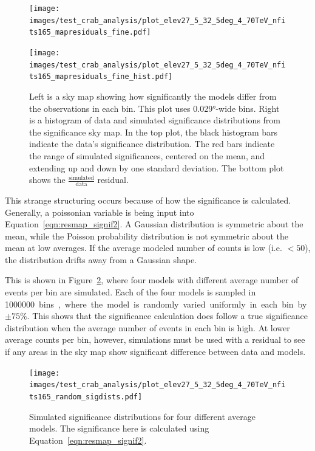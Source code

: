 \begin{figure}[h]
  \centering
  \hfill
  \begin{minipage}{0.4\textwidth}
    \centering
    \texttt{[image: images/test\_crab\_analysis/plot\_elev27\_5\_32\_5deg\_4\_70TeV\_nfits165\_mapresiduals\_fine.pdf]}
  \end{minipage}
  \hfill
  \begin{minipage}{0.45\textwidth}
    \centering
    \texttt{[image: images/test\_crab\_analysis/plot\_elev27\_5\_32\_5deg\_4\_70TeV\_nfits165\_mapresiduals\_fine\_hist.pdf]}
  \end{minipage}
  \hfill
  \hfill
  \caption[Crab Residual Sky Map and Distribution, Fine Binning]{
    Left is a sky map showing how significantly the models differ from the observations in each bin.
    This plot uses \ang{0.029}-wide bins.
    Right is a histogram of data and simulated significance distributions from the significance sky map.
    In the top plot, the black histogram bars indicate the data's significance distribution.
    The red bars indicate the range of simulated significances, centered on the mean, and extending up and down by one standard deviation.
    The bottom plot shows the $\frac{\textrm{simulated}}{\textrm{data}}$ residual.
  }
  \label{fig:resmap_sigdist_crab_fine}
\end{figure}

This strange structuring occurs because of how the significance is calculated.
Generally, a poissonian variable is being input into Equation~\ref{eqn:resmap_signif2}.
A Gaussian distribution is symmetric about the mean, while the Poisson probability distribution is not symmetric about the mean at low averages.
If the average modeled number of counts is low (i.e. $<50$), the distribution drifts away from a Gaussian shape.

This is shown in Figure~\ref{fig:various_sig_dists}, where four models with different average number of events per bin are simulated.
Each of the four models is sampled in \SI{1000000} bins, where the model is randomly varied uniformly in each bin by $\pm 75\%$.
This shows that the significance calculation does follow a true significance distribution when the average number of events in each bin is high.
At lower average counts per bin, however, simulations must be used with a residual to see if any areas in the sky map show significant difference between data and models.
  
\begin{figure}[h]
  \centering
  \texttt{[image: images/test\_crab\_analysis/plot\_elev27\_5\_32\_5deg\_4\_70TeV\_nfits165\_random\_sigdists.pdf]}
  \caption[4 Simulated Significance Distributions]{
    Simulated significance distributions for four different average models.
    The significance here is calculated using Equation~\ref{eqn:resmap_signif2}.
  }
  \label{fig:various_sig_dists}
\end{figure}


